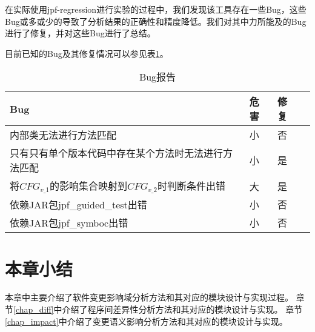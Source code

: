 在实际使用jpf-regression进行实验的过程中，我们发现该工具存在一些Bug，这些Bug或多或少的导致了分析结果的正确性和精度降低。我们对其中力所能及的Bug进行了修复，并对这些Bug进行了总结。

目前已知的Bug及其修复情况可以参见表\ref {bug_data}。

\begin{table}
	\caption{Bug报告}
	\label{bug_data}
	\centering
	\begin{tabular}{lllc}
		\toprule[1.5pt]
		{\heiti Bug} &{\heiti 危害} & {\heiti 修复} \\\midrule[1pt]
		内部类无法进行方法匹配 & 小 & 否\\
		只有只有单个版本代码中存在某个方法时无法进行方法匹配 & 小 & 是\\
		将$CFG_{v\_1}$的影响集合映射到$CFG_{v\_2}$时判断条件出错 & 大 & 是\\
		依赖JAR包jpf\_guided\_test出错 & 小 & 否\\
		依赖JAR包jpf\_symboc出错 & 小 & 否\\
		\bottomrule[1.5pt]
	\end{tabular}
\end{table}

\section{本章小结}

本章中主要介绍了软件变更影响域分析方法和其对应的模块设计与实现过程。
章节\ref {chap_diff}中介绍了程序间差异性分析方法和其对应的模块设计与实现。
章节\ref {chap_impact}中介绍了变更语义影响分析方法和其对应的模块设计与实现。
